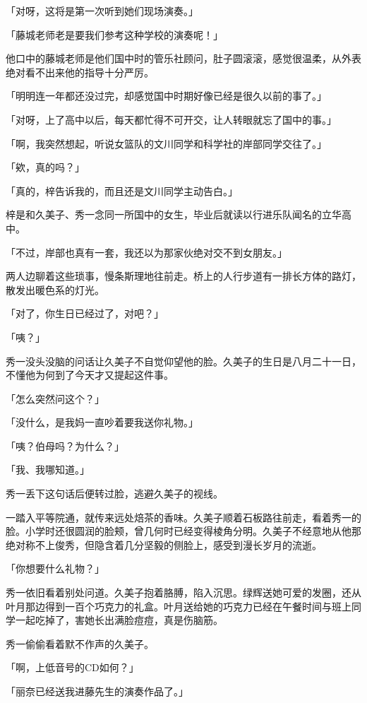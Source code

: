 \documentclass[UTF8]{ctexart}
\begin{document}
    「对呀，这将是第一次听到她们现场演奏。」 

    「藤城老师老是要我们参考这种学校的演奏呢！」 

    他口中的藤城老师是他们国中时的管乐社顾问，肚子圆滚滚，感觉很温柔，从外表绝对看不出来他的指导十分严厉。 

    「明明连一年都还没过完，却感觉国中时期好像已经是很久以前的事了。」 

    「对呀，上了高中以后，每天都忙得不可开交，让人转眼就忘了国中的事。」 

    「啊，我突然想起，听说女篮队的文川同学和科学社的岸部同学交往了。」 

    「欸，真的吗？」 

    「真的，梓告诉我的，而且还是文川同学主动告白。」 

    梓是和久美子、秀一念同一所国中的女生，毕业后就读以行进乐队闻名的立华高中。 

    「不过，岸部也真有一套，我还以为那家伙绝对交不到女朋友。」 

    两人边聊着这些琐事，慢条斯理地往前走。桥上的人行步道有一排长方体的路灯，散发出暖色系的灯光。 

    「对了，你生日已经过了，对吧？」 

    「咦？」 

    秀一没头没脑的问话让久美子不自觉仰望他的脸。久美子的生日是八月二十一日，不懂他为何到了今天才又提起这件事。 

    「怎么突然问这个？」 

    「没什么，是我妈一直吵着要我送你礼物。」 

    「咦？伯母吗？为什么？」 

    「我、我哪知道。」 

    秀一丢下这句话后便转过脸，逃避久美子的视线。 

    一踏入平等院通，就传来远处焙茶的香味。久美子顺着石板路往前走，看着秀一的脸。小学时还很圆润的脸颊，曾几何时已经变得棱角分明。久美子不经意地从他那绝对称不上俊秀，但隐含着几分坚毅的侧脸上，感受到漫长岁月的流逝。 

    「你想要什么礼物？」 

    秀一依旧看着别处问道。久美子抱着胳膊，陷入沉思。绿辉送她可爱的发圈，还从叶月那边得到一百个巧克力的礼盒。叶月送给她的巧克力已经在午餐时间与班上同学一起吃掉了，害她长出满脸痘痘，真是伤脑筋。 

    秀一偷偷看着默不作声的久美子。 

    「啊，上低音号的CD如何？」 

    「丽奈已经送我进藤先生的演奏作品了。」 
\end{document}

